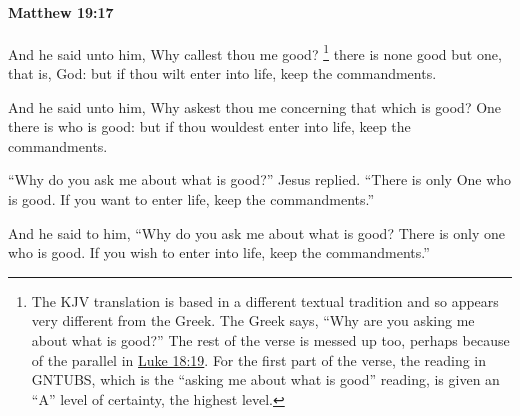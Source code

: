 		\paragraph{Matthew 19:17} %
			\label{MATTHEW-19-17}

			And he said unto him, Why callest thou me good?%
				\footnote{%
					The KJV translation is based in a different textual tradition and so appears very different from the Greek. The Greek says, ``Why are you asking me about what is good?'' The rest of the verse is messed up too, perhaps because of the parallel in \hyperref[LUKE-18-19]{Luke 18:19}. For the first part of the verse, the reading in GNTUBS, which is the ``asking me about what is good'' reading, is given an ``A'' level of certainty, the highest level.
					}
			there is none good but one, that is, God: but if thou wilt enter into life, keep the commandments.

			\begin{framed}
			\scriptsize
				\begin{compactdesc}
					\item[SBLG] 
					\item[ASV] And he said unto him, Why askest thou me concerning that which is good? One there is who is good: but if thou wouldest enter into life, keep the commandments.
					\item[NIV] ``Why do you ask me about what is good?'' Jesus replied. ``There is only One who is good. If you want to enter life, keep the commandments.''
					\item[NRSV] And he said to him, ``Why do you ask me about what is good? There is only one who is good. If you wish to enter into life, keep the commandments.''
				\end{compactdesc}
			\end{framed}

